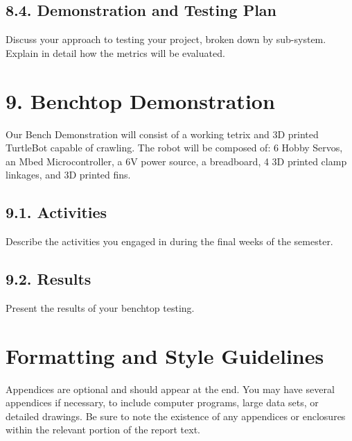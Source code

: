 \documentclass[10pt]{article}
\begin{document}
\subsection{8.4. Demonstration and Testing Plan}
Discuss your approach to testing your project, broken down by sub-system.
Explain in detail how the metrics will be evaluated. 

\section{9. Benchtop Demonstration}
Our Bench Demonstration will consist of a working tetrix and 3D printed TurtleBot capable of crawling. The robot will be composed of: 6 Hobby Servos, an Mbed Microcontroller, a 6V power source, a breadboard, 4 3D printed clamp linkages, and 3D printed fins. 

\subsection{9.1. Activities}
Describe the activities you engaged in during the final weeks of the semester.

\subsection{9.2. Results}
Present the results of your benchtop testing. 


\appendix
\section{Formatting and Style Guidelines}
Appendices are optional and should appear at the end. You may have several appendices if necessary, to include computer programs, large data sets, or detailed drawings. Be sure to note the existence of any appendices or enclosures within the relevant portion of the report text.  
\end{document}
